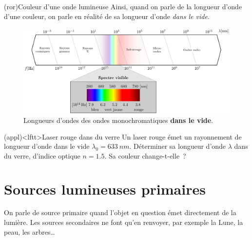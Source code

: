 \documentclass[../../main/main.tex]{subfiles}
\begin{document}
\begin{tcb*}[cnt, fontupper=\large](ror){Couleur d'une onde lumineuse}
	Ainsi, quand on parle de la longueur d'onde d'une couleur, on parle en réalité
	de sa longueur d'onde \textit{dans le vide}.
\end{tcb*}

\begin{figure}[h]
	\centering
	\includegraphics[width=.9\linewidth]{full_spectre}
	\caption{Longueurs d'ondes des ondes monochromatiques \textbf{dans le vide}.}
	\label{fig:lambda_vis}
\end{figure}

\begin{tcb*}(appl)<lftt>{Laser rouge dans du verre}
	Un laser rouge émet un rayonnement de longueur d'onde dans le vide
	$\lambda_0 = \SI{633}{nm}$. Déterminer sa longueur d'onde $\lambda$ dans du
	verre, d'indice optique $n = \num{1.5}$. Sa couleur change-t-elle~?
	\tcblower
\end{tcb*}

\section{Sources lumineuses primaires}

On parle de source primaire quand l'objet en question émet directement de la
lumière. Les sources secondaires ne font qu'en renvoyer, par exemple la Lune, la
peau, les arbres…
\end{document}
